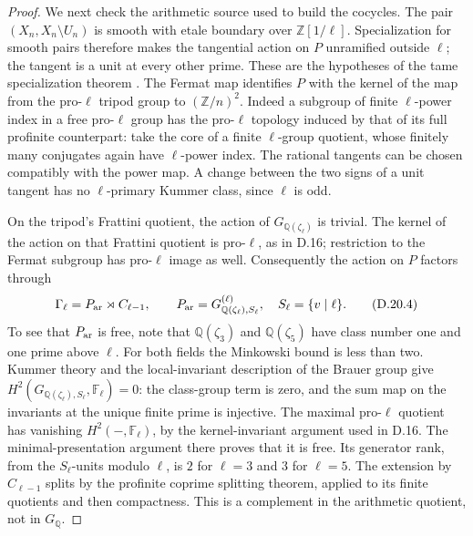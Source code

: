 \begin{proof}
We next check the arithmetic source used to build the
cocycles. The pair \((X_n,X_n\setminus U_n)\) is smooth
with etale boundary over \(\mathbb Z[1/\ell]\).
Specialization for smooth pairs therefore makes the
tangential action on \(P\) unramified outside \(\ell\);
the tangent is a unit at every other prime. These are
the hypotheses of the tame specialization theorem
\cite[Expos\'e XIII, Corollary 2.9 and \S2.10]{DE_SGA1}.
The Fermat map identifies \(P\) with the kernel of
the map from the pro-\(\ell\) tripod group to
\((\mathbb Z/n)^2\). Indeed a subgroup of finite
\(\ell\)-power index in a free pro-\(\ell\) group
has the pro-\(\ell\) topology induced by that of its
full profinite counterpart: take the core of a finite
\(\ell\)-group quotient, whose finitely many conjugates
again have \(\ell\)-power index. The rational tangents
can be chosen compatibly with the power map. A change
between the two signs of a unit tangent has no
\(\ell\)-primary Kummer class, since \(\ell\) is odd.

On the tripod's Frattini quotient, the action of
\(G_{\mathbb Q(\zeta_\ell)}\) is trivial. The kernel
of the action on that Frattini quotient is pro-\(\ell\),
as in D.16; restriction to the Fermat subgroup has
pro-\(\ell\) image as well. Consequently the action
on \(P\) factors through
\[
 \Gamma_\ell=P_{\rm ar}\rtimes C_{\ell-1},\qquad
 P_{\rm ar}=G_{\mathbb Q(\zeta_\ell),S_\ell}^{(\ell)},
 \quad S_\ell=\{v\mid\ell\}.                         \tag{D.20.4}
\]
To see that \(P_{\rm ar}\) is free, note that
\(\mathbb Q(\zeta_3)\) and \(\mathbb Q(\zeta_5)\)
have class number one and one prime above \(\ell\).
For both fields the Minkowski bound is less than two.
Kummer theory and
the local-invariant description of the Brauer group
give
\(H^2(G_{\mathbb Q(\zeta_\ell),S_\ell},\mathbb F_\ell)=0\):
the class-group term is zero, and the sum map on
the invariants at the unique finite prime is injective.
The maximal pro-\(\ell\) quotient has vanishing
\(H^2(-,\mathbb F_\ell)\), by the kernel-invariant
argument used in D.16. The minimal-presentation
argument there proves that it is free. Its generator
rank, from the \(S_\ell\)-units modulo \(\ell\), is
\(2\) for \(\ell=3\) and \(3\) for \(\ell=5\).
The extension by \(C_{\ell-1}\) splits by the
profinite coprime splitting theorem, applied to its
finite quotients and then compactness. This is a
complement in the arithmetic quotient, not in
\(G_{\mathbb Q}\).


\end{proof}
